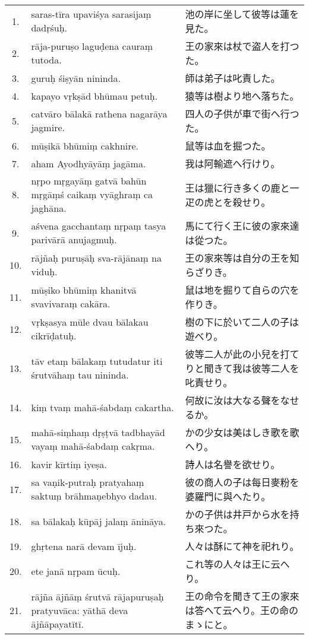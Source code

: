 \begin{longtable}{c*{2}{p{0.45\hsize}}}
 1. & saras-tīra upaviśya sarasi\-jaṃ dadṛśuḥ. & 池の岸に坐して彼等は蓮を見た。\\
 2. & rāja-puruṣo laguḍena cauraṃ tutoda. & 王の家來は杖で盗人を打つた。\\
 3. & guruḥ śiṣyān nininda. & 師は弟子は叱責した。\\
 4. & kapayo vṛkṣād bhūmau petuḥ. & 猿等は樹より地へ落ちた。\\
 5. & catvāro bālakā rathena naga\-rāya jagmire. & 四人の子供が車で街へ行つた。\\
 6. & mūṣikā bhūmiṃ cakhnire. & 鼠等は血を掘つた。\\
 7. & aham Ayodhyāyāṃ jagāma. & 我は阿輸遮へ行けり。\\
 8. & nṛpo mṛgayāṃ gatvā bahūn mṛgāṃś caikaṃ vyāghraṃ ca jaghāna.
 & 王は獵に行き多くの鹿と一疋の虎とを殺せり。\\
 9. & aśvena gacchantaṃ nṛpaṃ tasya parivārā anujagmuḥ. & 馬にて行く王に彼の家來達
は從つた。\\
10. & rājñaḥ puruṣāḥ sva-rājānaṃ na viduḥ. & 王の家來等は自分の王を知
らざりき。\\
11. & mūṣiko bhūmiṃ khanitvā sva\-vivaraṃ cakāra. & 鼠は地を掘りて自らの穴を作りき。\\
12. & vṛkṣasya mūle dvau bālakau cikrīḍatuḥ. & 樹の下に於いて二人の子は遊べり。\\
13. & tāv etaṃ bālakaṃ tutudatur iti śrutvāhaṃ tau nininda. & 彼等二人が此の小兒を打て
りと聞きて我は彼等二人を叱責せり。\\
14. & kiṃ tvaṃ mahā-śabdaṃ ca\-kartha. & 何故に汝は大なる聲をなせるか。\\
15. & mahā-siṃhaṃ dṛṣṭvā tad\-bhayād vayaṃ mahā-śabdaṃ cakṛma. & かの少女は美はしき歌を歌へり。\\
16. & kavir kīrtiṃ iyeṣa. & 詩人は名譽を欲せり。\\
17. & sa vaṇik-putraḥ pratyahaṃ saktuṃ brāhmaṇebhyo dadau. & 彼の商人の子は每日麥粉を
婆羅門に與へたり。\\
18. & sa bālakaḥ kūpāj jalaṃ ānināya. & かの子供は井戸から水を持ち來つた。\\
19. & ghṛtena narā devam ījuḥ. & 人々は酥にて神を祀れり。\\
20. & ete janā nṛpam ūcuḥ. & これ等の人々は王に云へり。\\
21. & rājña ājñāṃ śrutvā rāja\-puruṣaḥ pratyuvāca: yāthā deva ājñāpayatītī.
& 王の命令を聞きて王の家來は答へて云へり。王の命のまゝにと。\\

\end{longtable}
